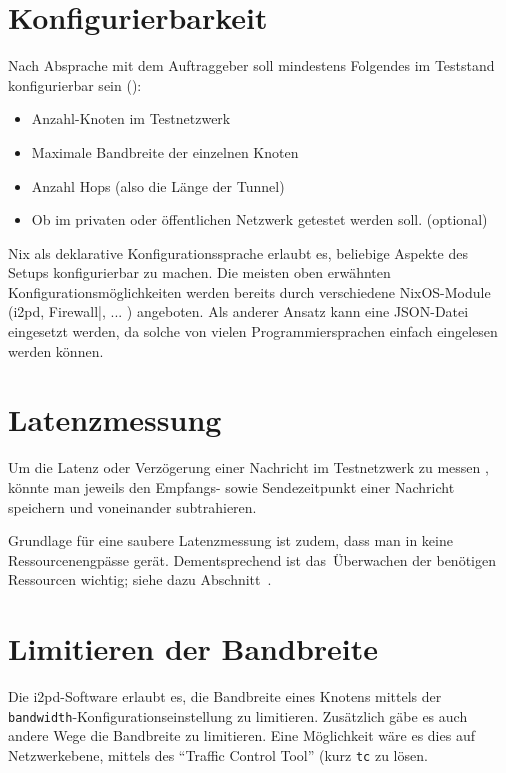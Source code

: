 \section{Konfigurierbarkeit}

Nach Absprache mit dem Auftraggeber soll mindestens Folgendes im Teststand konfigurierbar sein ():

\begin{itemize}
    \item Anzahl-Knoten im Testnetzwerk
    \item Maximale Bandbreite der einzelnen Knoten
    \item Anzahl Hops (also die Länge der Tunnel)
    \item Ob im privaten oder öffentlichen Netzwerk getestet werden soll. (optional)
\end{itemize}

Nix als deklarative Konfigurationssprache erlaubt es, beliebige Aspekte des Setups konfigurierbar zu machen.
Die meisten oben erwähnten Konfigurationsmöglichkeiten werden bereits durch verschiedene NixOS-Module (i2pd, Firewall|, ... ) angeboten.
Als anderer Ansatz kann eine JSON-Datei eingesetzt werden, da solche von vielen Programmiersprachen einfach eingelesen werden können.

\section{Latenzmessung}

Um die Latenz oder Verzögerung einer Nachricht im Testnetzwerk zu messen , könnte man jeweils den Empfangs- sowie Sendezeitpunkt einer Nachricht speichern und voneinander subtrahieren.


Grundlage für eine saubere Latenzmessung ist zudem, dass man in keine Ressourcenengpässe gerät.
Dementsprechend ist das Überwachen der benötigen Ressourcen wichtig; siehe dazu Abschnitt~.

\section{Limitieren der Bandbreite}

Die i2pd-Software erlaubt es, die Bandbreite eines Knotens  mittels der \lstinline|bandwidth|-Konfigurationseinstellung  zu limitieren. 
Zusätzlich gäbe es auch andere Wege die Bandbreite zu limitieren.
Eine Möglichkeit wäre es dies auf Netzwerkebene, mittels des ``Traffic Control Tool'' (kurz \lstinline|tc| zu lösen.

